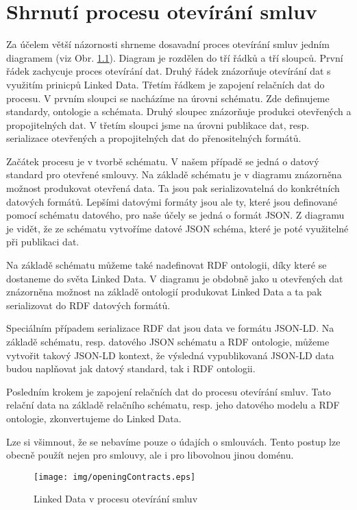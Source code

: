 \chapter{Shrnutí procesu otevírání smluv}

Za účelem větší názornosti shrneme dosavadní proces otevírání smluv jedním diagramem (viz Obr. \ref{obr:openingContracts}). Diagram je rozdělen do tří řádků a tří sloupců. První řádek zachycuje proces otevírání dat. Druhý řádek znázorňuje otevírání dat s využitím prinicpů Linked Data. Třetím řádkem je zapojení relačních dat do procesu. V prvním sloupci se nacházíme na úrovni schématu. Zde definujeme standardy, ontologie a schémata. Druhý sloupec znázorňuje produkci otevřených a propojitelných dat. V třetím sloupci jsme na úrovni publikace dat, resp. serializace otevřených a propojitelných dat do přenositelných formátů.

Začátek procesu je v tvorbě schématu. V našem případě se jedná o datový standard pro otevřené smlouvy. Na základě schématu je v diagramu znázorněna možnost produkovat otevřená data. Ta jsou pak serializovatelná do konkrétních datových formátů. Lepšími datovými formáty jsou ale ty, které jsou definované pomocí schématu datového, pro naše účely se jedná o formát JSON. Z diagramu je vidět, že ze schématu vytvoříme datové JSON schéma, které je poté využitelné při publikaci dat.

Na základě schématu můžeme také nadefinovat RDF ontologii, díky které se dostaneme do světa Linked Data. V diagramu je obdobně jako u otevřených dat znázorněna možnost na základě ontologií produkovat Linked Data a ta pak serializovat do RDF datových formátů.

Speciálním případem serializace RDF dat jsou data ve formátu JSON-LD. Na základě schématu, resp. datového JSON schématu a RDF ontologie, můžeme vytvořit takový JSON-LD kontext, že výsledná vypublikovaná JSON-LD data budou naplňovat jak datový standard, tak i RDF ontologii.

Posledním krokem je zapojení relačních dat do procesu otevírání smluv. Tato relační data na základě relačního schématu, resp. jeho datového modelu a RDF ontologie, zkonvertujeme do Linked Data.

Lze si všimnout, že se nebavíme pouze o údajích o smlouvách. Tento postup lze obecně použít nejen pro smlouvy, ale i pro libovolnou jinou doménu.

\begin{figure}[H]
\centerline{\texttt{[image: img/openingContracts.eps]}}
\caption{Linked Data v procesu otevírání smluv}
\label{obr:openingContracts}
\end{figure}